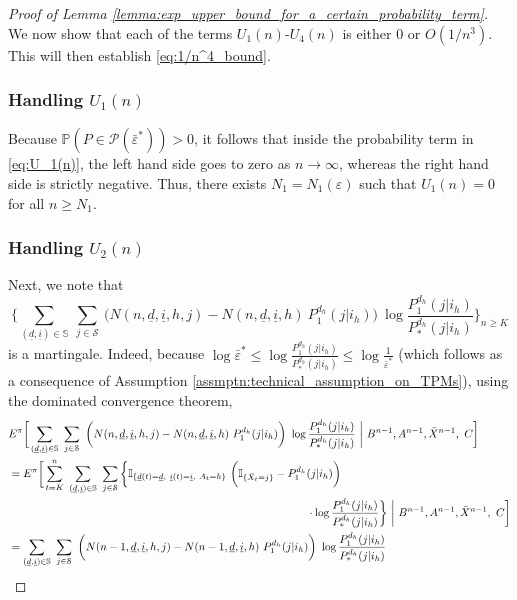 \begin{proof}[Proof of Lemma \ref{lemma:exp_upper_bound_for_a_certain_probability_term}]
We now show that each of the terms $U_1(n)$-$U_4(n)$ is either $0$ or $O(1/n^3)$. This will then establish \eqref{eq:1/n^4_bound}.

\subsubsection{Handling $U_1(n)$}
Because $\mathbb{P}(P\in \mathscr{P}(\bar{\varepsilon}^*))>0$, it follows that inside the probability term in \eqref{eq:U_1(n)},
 the left hand side goes to zero as $n\to\infty$, whereas the right hand side is strictly negative. Thus, there exists $N_1=N_1(\varepsilon)$ such that $U_1(n)=0$ for all $n\geq N_1$.

\subsubsection{Handling $U_2(n)$}
Next, we note that $$\bigg\lbrace\sum\limits_{(\underline{d}, \underline{i})\in \mathbb{S}}~\sum\limits_{j\in \mathcal{S}}~\bigg(N(n, \underline{d}, \underline{i}, h, j)-N(n, \underline{d}, \underline{i}, h)~P_1^{d_h}(j|i_h)\bigg)~\log \frac{P_1^{d_h}(j|i_h)}{P_*^{d_h}(j|i_h)}\bigg\rbrace_{n\geq K}$$ is a martingale. Indeed, because $\log \bar{\varepsilon}^* \leq \log \frac{P_1^{d_h}(j|i_h)}{P_*^{d_h}(j|i_h)} \leq \log \frac{1}{\bar{\varepsilon}^*}$ (which follows as a consequence of Assumption \ref{assmptn:technical_assumption_on_TPMs}), using the dominated convergence theorem,
\begin{align}
	&E^\pi\bigg[\sum\limits_{(\underline{d}, \underline{i})\in \mathbb{S}}~\sum\limits_{j\in \mathcal{S}}~\bigg(N(n, \underline{d}, \underline{i}, h, j)-N(n, \underline{d}, \underline{i}, h)~P_1^{d_h}(j|i_h)\bigg)~\log \frac{P_1^{d_h}(j|i_h)}{P_*^{d_h}(j|i_h)}~\bigg|~B^{n-1}, A^{n-1}, \bar{X}^{n-1}, ~C\bigg]\nonumber\\
	&=E^\pi\bigg[\sum\limits_{t=K}^{n}~\sum\limits_{(\underline{d}, \underline{i})\in \mathbb{S}}~\sum\limits_{j\in \mathcal{S}}\bigg\lbrace\mathbb{I}_{\{\underline{d}(t)=\underline{d},~\underline{i}(t)=\underline{i},~A_t=h\}}~\bigg(\mathbb{I}_{\{\bar{X}_t=j\}}-P_1^{d_h}(j|i_h)\bigg)\nonumber\\
	&\hspace{9.5cm}\cdot\log \frac{P_1^{d_h}(j|i_h)}{P_*^{d_h}(j|i_h)}\bigg\rbrace~\bigg|~B^{n-1}, A^{n-1}, \bar{X}^{n-1}, ~C\bigg]\nonumber\\
	&=\sum\limits_{(\underline{d}, \underline{i})\in \mathbb{S}}~\sum\limits_{j\in \mathcal{S}}~\bigg(N(n-1, \underline{d}, \underline{i}, h, j)-N(n-1, \underline{d}, \underline{i}, h)~P_1^{d_h}(j|i_h)\bigg)~\log \frac{P_1^{d_h}(j|i_h)}{P_*^{d_h}(j|i_h)}\nonumber\\

\end{align}
\end{proof}
